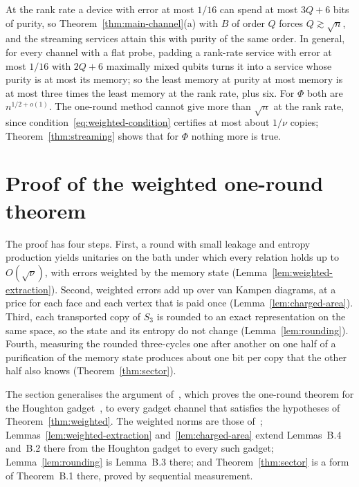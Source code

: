 \begin{remark}\label{rem:sqrt-limit}
At the rank rate a device with error at most $1/16$ can spend at most $3Q+6$ bits of purity, so Theorem~\ref{thm:main-channel}(a) with $B$ of order $Q$ forces $Q\gtrsim\sqrt n$,
and the streaming services attain this with purity of the same order. In general, for every channel with a flat probe, padding a rank-rate
service with error at most $1/16$ with $2Q+6$ maximally mixed qubits turns it into a service whose purity is at most its memory; so the least memory at purity at most
memory is at most three times the least memory at the rank rate, plus six. For $\Phi$ both are $n^{1/2+o(1)}$. The one-round method cannot give
more than $\sqrt n$ at the rank rate, since condition~\eqref{eq:weighted-condition} certifies at most about $1/\nu$ copies; Theorem~\ref{thm:streaming}
shows that for $\Phi$ nothing more is true.
\end{remark}

\section{Proof of the weighted one-round theorem}\label{sec:weighted-proof}

The proof has four steps. First, a round with small leakage and entropy production yields unitaries on the bath under which every relation
holds up to $O(\sqrt\nu)$, with errors weighted by the memory state (Lemma~\ref{lem:weighted-extraction}). Second, weighted errors add up over van
Kampen diagrams, at a price for each face and each vertex that is paid once (Lemma~\ref{lem:charged-area}). Third, each transported copy of $S_3$ is rounded to an
exact representation on the same space, so the state and its entropy do not change (Lemma~\ref{lem:rounding}). Fourth, measuring the rounded
three-cycles one after another on one half of a purification of the memory state produces about one bit per copy that the other half also knows
(Theorem~\ref{thm:sector}).

The section generalises the argument of~\cite[Appendix~B]{DouglasMghirbiB}, which proves the one-round theorem for the Houghton
gadget~\cite[Theorem~5.5]{DouglasMghirbiB}, to every gadget channel that satisfies the hypotheses of Theorem~\ref{thm:weighted}. The weighted norms
are those of~\cite[Appendix~B]{DouglasMghirbiB}; Lemmas~\ref{lem:weighted-extraction} and~\ref{lem:charged-area} extend Lemmas~B.4 and~B.2
there from the Houghton gadget to every such gadget; Lemma~\ref{lem:rounding} is Lemma~B.3 there; and Theorem~\ref{thm:sector} is a form of
Theorem~B.1 there, proved by sequential measurement.

